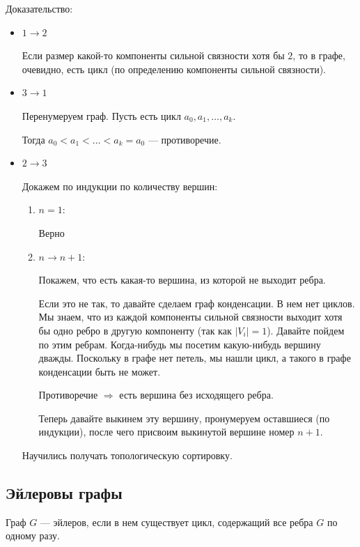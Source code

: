 Доказательство:
\begin{itemize}
    \item
        \( 1 \to 2 \)

        Если размер какой-то компоненты сильной связности хотя бы \( 2 \), то в графе, очевидно, есть цикл
        (по определению компоненты сильной  связности).
    \item
        \( 3 \to 1 \)

        Перенумеруем граф.
        Пусть есть цикл \( a_0, a_1, \ldots, a_k \).

        Тогда \( a_0 < a_1 < \ldots < a_k = a_0 \) --- противоречие.
    \item
        \( 2 \to 3 \)

        Докажем по индукции по количеству вершин:
        \begin{enumerate}
            \item
                \( n = 1 : \)

                Верно
            \item
                \( n \to n + 1 : \)

                Покажем, что есть какая-то вершина, из которой не выходит ребра.

                Если это не так, то давайте сделаем граф конденсации.
                В нем нет циклов.
                Мы знаем, что из каждой компоненты сильной связности выходит
                хотя бы одно ребро в другую компоненту (так как \( |V_i| = 1 \)).
                Давайте пойдем по этим ребрам.
                Когда-нибудь мы посетим какую-нибудь вершину дважды.
                Поскольку в графе нет петель, мы нашли цикл, а такого в графе конденсации быть не может.

                Противоречие \( \Rightarrow \) есть вершина без исходящего ребра.

                Теперь давайте выкинем эту вершину, пронумеруем оставшиеся (по индукции),
                после чего присвоим выкинутой вершине номер \( n + 1 \).
        \end{enumerate}

        Научились получать топологическую сортировку.
\end{itemize}

\subsection{Эйлеровы графы}

\begin{defn}{}{}
    Граф \( G \) --- эйлеров, если в нем существует цикл, содержащий все ребра \( G \) по одному разу.
\end{defn}

